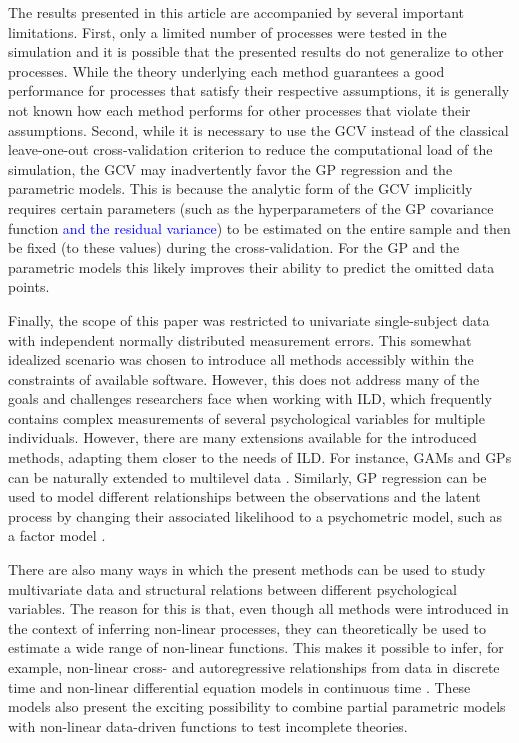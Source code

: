\documentclass[man, floatsintext]{apa7}
\begin{document}
The results presented in this article are accompanied by several important
limitations. First, only a limited number of processes were tested in the
simulation and it is possible that the presented results do not generalize to
other processes. While the theory underlying each method guarantees a good
performance for processes that satisfy their respective assumptions, it is
generally not known how each method performs for other processes that violate
their assumptions. Second, while it is necessary to use the GCV instead of the
classical leave-one-out cross-validation criterion to reduce the computational
load of the simulation, the GCV may inadvertently favor the GP regression and
the parametric models. This is because the analytic form of the GCV
implicitly requires certain parameters (such as the hyperparameters of the GP
covariance function \textcolor{blue}{and the residual variance}) to be
estimated on the entire sample and then be fixed (to these values) during the
cross-validation. For the GP and the parametric models this likely improves
their ability to predict the omitted data points.

Finally, the scope of this paper was restricted to univariate single-subject
data with independent normally distributed measurement errors. This somewhat
idealized scenario was chosen to introduce all methods accessibly within the
constraints of available software. However, this does not address many of the
goals and challenges researchers face when working with ILD, which
frequently contains complex measurements of several psychological variables for
multiple individuals. However, there are many extensions available for the
introduced methods, adapting them closer to the needs of ILD\@. For instance,
GAMs and GPs can be naturally extended to multilevel data
\parencite{karch_gaussian_2020, wood_generalized_2006}. Similarly, GP
regression can be used to model different relationships between the
observations and the latent process by changing their associated likelihood to
a psychometric model, such as a factor model \parencite{clark_dynamic_2023,
  yu_gaussian-process_2009}.

There are also many ways in which the present methods can be used to study
multivariate data and structural relations between different psychological
variables. The reason for this is that, even though all methods were introduced
in the context of inferring non-linear processes, they can theoretically be
used to estimate a wide range of non-linear functions. This makes it possible
to infer, for example, non-linear cross- and autoregressive relationships from
data in discrete time \parencite{bringmann_modeling_2015,
  wood_generalized_2006, rasmussen_gaussian_2006,
  eleftheriadis_identification_2017} and non-linear differential equation
models
in continuous time \parencite{yildiz_learning_2018}. These models also present
the exciting possibility to combine partial parametric models with non-linear
data-driven functions to test incomplete theories.
\end{document}
